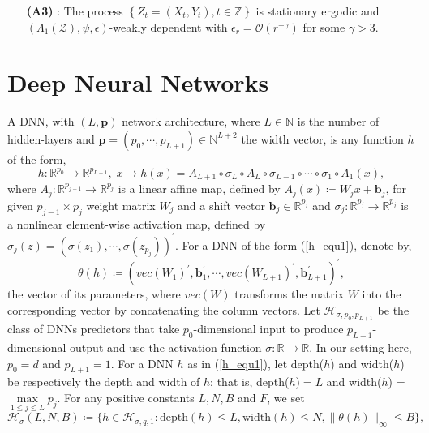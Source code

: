 \documentclass[10pt,twoside]{article}
\numberwithin{equation}{section}
\newcommand{\R}{\ensuremath{\mathbb{R}}}
\newcommand{\Z}{\ensuremath{\mathbb{Z}}}
\newcommand{\N}{\ensuremath{\mathbb{N}}}
\begin{document}
%
\begin{itemize}
%
\item[\textbf{(A3)}]: The process $\left\{ Z_t = (X_t, Y_t), {t \in \Z} \right\}$  is stationary ergodic and   $(\Lambda_1 (\mathcal{Z}), \psi, \epsilon)$-weakly dependent with $\epsilon_r = \mathcal{O}(r^{-\gamma})$ 
  for some $\gamma > 3$.
%
\end{itemize}
%
%


\section{ Deep Neural Networks }\label{Def_DNNs}
A DNN, with $ (L,   \textbf{p}) $  network architecture, where $L \in \N$ is the number of hidden-layers and $ \textbf{p}=(p_{0},   \cdots,  p_{L+1}) \in \N^{L+2}$ the width vector, is any function  $h$ of the form, 
%
\begin{equation}\label{h_equ1}
h: \R^{p_0} \rightarrow \R^{p_{L+1}}, \;   x\mapsto h(x) = A_{L+1} \circ \sigma_{L} \circ A_{L} \circ \sigma_{L-1} \circ \cdots \circ \sigma_1 \circ A_1 (x),
\end{equation} 
%
where $ A_j: \R^ {p_ {j -1}} \rightarrow \R^ {p_j} $ is a linear affine map, defined by $A_j (x) \coloneqq W_j x + \textbf{b}_j$,  for given  $p_ {j - 1}\times p_j$  weight matrix   $ W_j$   and a shift vector $ \textbf{b}_j \in \R^ {p_j} $  and $\sigma_j: \R^{p_j} \rightarrow \R^ {p_j} $ is a nonlinear element-wise activation map, defined by $\sigma_j (z) = (\sigma(z_1), \cdots, \sigma(z_{p_j}))^ {'} $.
%   
%
For a DNN of the form (\ref{h_equ1}), denote by,
%
\begin{equation} \label{def_theta_h}
 \theta(h) \coloneqq \left(vec(W_1)^ {'}, \textbf{b}^{'}_{1}, \cdots,  vec(W_{L + 1})^{'} , \textbf{b}^ {'}_{L+1} \right)^{'}, 
 \end{equation} 
%
the vector of its parameters, where $ vec(W)$ transforms the matrix $W$ into the corresponding vector by concatenating the  column vectors. 
Let $\mathcal{H}_{\sigma, p_0, p_ {L+1}} $ be the class of DNNs predictors that take $p_0$-dimensional input to produce $p_ {L+1} $-dimensional output and use the activation function $ \sigma: \R \rightarrow \R$.
In our setting here, $p_0 = d$ and $p_ {L + 1} = 1$.
%
For a DNN $h$ as in (\ref{h_equ1}), let depth($h$) and width($h$) be  respectively the depth and width of $h$; that is, depth($h$)$=L$ and width($h$) = $\underset{1\leq j \leq L} {\max} p_j $. For any positive constants $L, N,   B$ and $F$, we set
%
\[ \mathcal{H}_{\sigma}(L, N, B) \coloneqq \big \{h\in \mathcal{H}_{\sigma, q, 1}: \text{depth}(h)\leq L, \text{width}(h)\leq N, \|\theta(h)\|_{\infty} \leq B \big\},  \]
\end{document}
